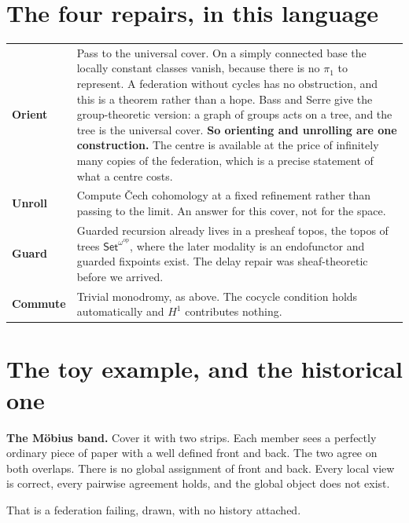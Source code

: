 \documentclass[11pt,a4paper]{article}
\begin{document}
\section{The four repairs, in this language}

\begin{center}
\begin{tabular}{@{}l@{\hspace{4mm}}>{\raggedright\arraybackslash}p{}@{}}
\toprule
\textbf{Orient} & Pass to the universal cover. On a simply connected base the
locally constant classes vanish, because there is no $\pi_1$ to represent. A
federation without cycles has no obstruction, and this is a theorem rather than a
hope. Bass and Serre give the group-theoretic version: a graph of groups acts on a
tree, and the tree is the universal cover. \textbf{So orienting and unrolling are
one construction.} The centre is available at the price of infinitely many copies
of the federation, which is a precise statement of what a centre costs. \\[2mm]
\textbf{Unroll} & Compute \v{C}ech cohomology at a fixed refinement rather than
passing to the limit. An answer for this cover, not for the space. \\[2mm]
\textbf{Guard} & Guarded recursion already lives in a presheaf topos, the topos of
trees $\mathsf{Set}^{\omega^{\mathrm{op}}}$, where the later modality is an
endofunctor and guarded fixpoints exist. The delay repair was sheaf-theoretic
before we arrived. \\[2mm]
\textbf{Commute} & Trivial monodromy, as above. The cocycle condition holds
automatically and $H^1$ contributes nothing. \\
\bottomrule
\end{tabular}
\end{center}

\section{The toy example, and the historical one}

\textbf{The M\"obius band.} Cover it with two strips. Each member sees a perfectly
ordinary piece of paper with a well defined front and back. The two agree on both
overlaps. There is no global assignment of front and back. Every local view is
correct, every pairwise agreement holds, and the global object does not exist.

That is a federation failing, drawn, with no history attached.
\end{document}
